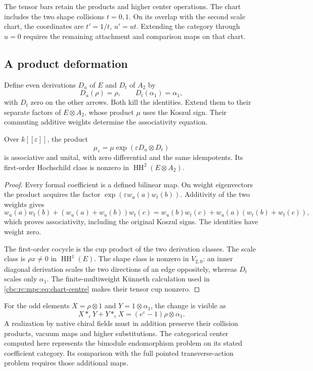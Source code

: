 The tensor bars retain the products
and higher center operations.  The chart includes the two shape
collisions \(t=0,1\).  On its overlap with the second scale chart,
the coordinates are \(t'=1/t\), \(u'=ut\).  Extending the category
through \(u=0\) requires the remaining attachment and comparison
maps on that chart.

\subsection{A product deformation}

Define even derivations \(D_u\) of \(E\) and \(D_t\) of \(A_2\)
by
\[
 D_u(\rho)=\rho,\qquad D_t(\alpha_1)=\alpha_1,
\]
with \(D_t\) zero on the other arrows.  Both kill the identities.
Extend them to their separate factors of \(E\otimes A_2\), whose
product \(\mu\) uses the Koszul sign.
Their commuting additive weights determine the associativity equation.

\begin{proposition}\label{cbc:rc:mpc:prop:twist}
Over \(k[[\varepsilon]]\), the product
\[
 \mu_\varepsilon=\mu\exp(\varepsilon D_u\otimes D_t)
\]
is associative and unital, with zero differential and the same
idempotents.  Its first-order Hochschild class is nonzero in
\(\operatorname{HH}^2(E\otimes A_2)\).
\end{proposition}
\begin{proof}
Every formal coefficient is a defined bilinear map.  On weight
eigenvectors the product acquires the factor
\(\exp(\varepsilon w_u(a)w_t(b))\).  Additivity of the two weights
gives
\[
 w_u(a)w_t(b)+(w_u(a)+w_u(b))w_t(c)
 =w_u(b)w_t(c)+w_u(a)(w_t(b)+w_t(c)),
\]
which proves associativity, including the original Koszul signs.
The identities have weight zero.

The first-order cocycle is the
cup product of the two derivation classes.  The scale class is
\(\rho x\ne0\) in \(\operatorname{HH}^1(E)\).  The shape class is
nonzero in \(V_{2,0}\): an inner diagonal derivation scales the
two directions of an edge oppositely, whereas \(D_t\) scales only
\(\alpha_1\).  The finite-multiweight K\"unneth calculation used in
\eqref{cbc:rc:mpc:eq:chart-centre} makes their tensor cup nonzero.
\end{proof}

For the odd elements \(X=\rho\otimes1\) and
\(Y=1\otimes\alpha_1\), the change is visible as
\[
 X*_\varepsilon Y+Y*_\varepsilon X
 =(e^\varepsilon-1)\rho\otimes\alpha_1.
\]
A realization by native chiral fields must in addition preserve
their collision products, vacuum maps and higher substitutions.
The categorical center computed here represents the bimodule
endomorphism problem on its stated coefficient category. Its
comparison with the full pointed transverse-action problem
requires those additional maps.
